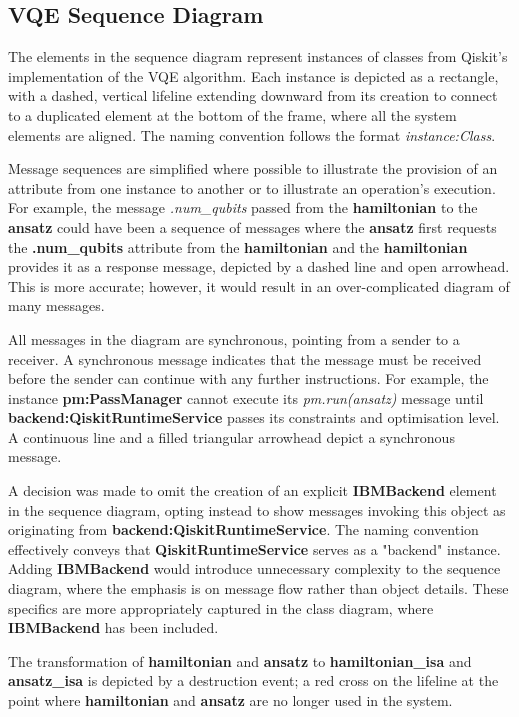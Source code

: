 \documentclass{article}
\begin{document}
{\subsection{VQE Sequence Diagram}

The elements in the sequence diagram represent instances of classes from Qiskit’s implementation of the VQE algorithm. Each instance is depicted as a rectangle, with a dashed, vertical lifeline extending downward from its creation to connect to a duplicated element at the bottom of the frame, where all the system elements are aligned. The naming convention follows the format \textit{instance:Class}.

Message sequences are simplified where possible to illustrate the provision of an attribute from one instance to another or to illustrate an operation's execution. For example, the message \textit{.num\_qubits} passed from the \textbf{hamiltonian} to the \textbf{ansatz} could have been a sequence of messages where the \textbf{ansatz} first requests the \textbf{.num\_qubits} attribute from the \textbf{hamiltonian} and the \textbf{hamiltonian} provides it as a response message, depicted by a dashed line and open arrowhead. This is more accurate; however, it would result in an over-complicated diagram of many messages. 

All messages in the diagram are synchronous, pointing from a sender to a receiver. A synchronous message indicates that the message must be received before the sender can continue with any further instructions\cite{Seidl_Scholz_Huemer_Kappel_Duffy_2014}. For example, the instance \textbf{pm:PassManager} cannot execute its \textit{pm.run(ansatz)} message until \textbf{backend:QiskitRuntimeService} passes its constraints and optimisation level. A continuous line and a filled triangular arrowhead depict a synchronous message.

A decision was made to omit the creation of an explicit \textbf{IBMBackend} element in the sequence diagram, opting instead to show messages invoking this object as originating from \textbf{backend:QiskitRuntimeService}.
The naming convention effectively conveys that \textbf{QiskitRuntimeService} serves as a "backend" instance. Adding \textbf{IBMBackend} would introduce unnecessary complexity to the sequence diagram, where the emphasis is on message flow rather than object details. These specifics are more appropriately captured in the class diagram, where \textbf{IBMBackend} has been included.

The transformation of \textbf{hamiltonian} and \textbf{ansatz} to \textbf{hamiltonian\_isa} and \textbf{ansatz\_isa} is depicted by a destruction event; a red cross on the lifeline at the point where \textbf{hamiltonian} and \textbf{ansatz} are no longer used in the system.

}
\end{document}
